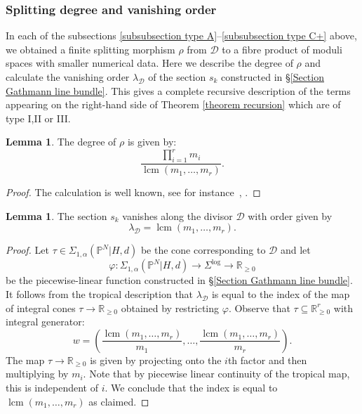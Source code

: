 \documentclass[11pt]{amsart}
\newcommand{\lcm}{\operatorname{lcm}}
\newcommand{\PP}{\mathbb P}
\renewcommand{\to}{\rightarrow}
\newcommand{\Dcal}{\mathcal{D}}
\newcommand{\RR}{\mathbb{R}}
\theoremstyle{definition}
\newtheorem{lemma}[thm]{Lemma}
\theoremstyle{definition}
\begin{document}
\subsubsection{Splitting degree and vanishing order} \label{subsubsection splitting degree} In each of the subsections \ref{subsubsection type A}--\ref{subsubsection type C+} above, we obtained a finite splitting morphism $\rho$ from $\Dcal$ to a fibre product of moduli spaces with smaller numerical data. Here we describe the degree of $\rho$ and calculate the vanishing order $\lambda_\Dcal$ of the section $s_k$ constructed in \S \ref{Section Gathmann line bundle}. This gives a complete recursive description of the terms appearing on the right-hand side of Theorem \ref{theorem recursion} which are of type I,II or III.

\begin{lemma}\label{lem:saturation} The degree of $\rho$ is given by:
\begin{equation*} \label{degree of gluing} \dfrac{\prod_{i=1}^r m_i}{\lcm(m_1,\ldots,m_r)}. \end{equation*}\end{lemma}
\begin{proof} The calculation is well known, see for instance~\cite[Section~7.9]{ChenDegeneration}, \cite[Section~5.3]{ACGSDecomposition}.
\end{proof}

\begin{lemma}\label{lemma vanishing order} The section $s_k$ vanishes along the divisor $\Dcal$ with order given by 
\[
\lambda_\Dcal = \lcm(m_1,\ldots,m_r).
\] 
\end{lemma}
\begin{proof} Let $\tau \in \Sigma_{1,\alpha}(\PP^N|H,d)$ be the cone corresponding to $\Dcal$ and let
\begin{equation*} \varphi \colon \Sigma_{1,\alpha}(\PP^N|H,d) \to \Sigma^{\log} \to \RR_{\geq 0} \end{equation*}
be the piecewise-linear function constructed in \S \ref{Section Gathmann line bundle}. It follows from the tropical description that $\lambda_\Dcal$ is equal to the index of the map of integral cones $\tau \to \RR_{\geq 0}$ obtained by restricting $\varphi$. Observe that $\tau \subseteq \RR_{\geq 0}^r$ with integral generator:
\begin{equation*} w = \left( \dfrac{\lcm(m_1,\ldots,m_r)}{m_1},\ldots,\dfrac{\lcm(m_1,\ldots,m_r)}{m_r} \right).\end{equation*}
The map $\tau \to \RR_{\geq 0}$ is given by projecting onto the $i$th factor and then multiplying by $m_i$. Note that by piecewise linear continuity of the tropical map, this is independent of $i$. We conclude that the index is equal to $\lcm(m_1,\ldots,m_r)$ as claimed.\end{proof}
\end{document}
